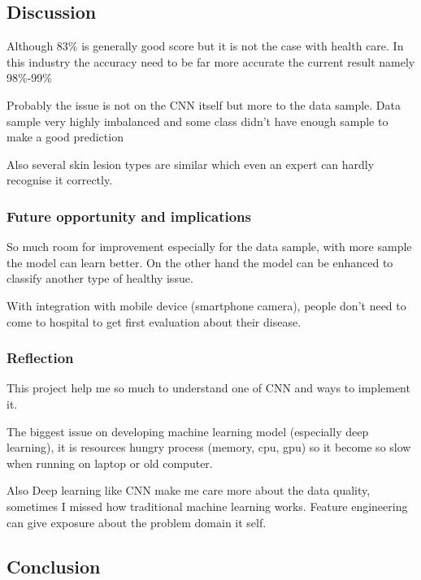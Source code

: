 \documentclass[11pt]{article}
\begin{document}
    \hypertarget{discussion}{%
\subsection{Discussion}\label{discussion}}

Although 83\% is generally good score but it is not the case with health
care. In this industry the accuracy need to be far more accurate the
current result namely 98\%-99\%

Probably the issue is not on the CNN itself but more to the data sample.
Data sample very highly imbalanced and some class didn't have enough
sample to make a good prediction

Also several skin lesion types are similar which even an expert can
hardly recognise it correctly.

\hypertarget{future-opportunity-and-implications}{%
\subsubsection{Future opportunity and
implications}\label{future-opportunity-and-implications}}

So much room for improvement especially for the data sample, with more
sample the model can learn better. On the other hand the model can be
enhanced to classify another type of healthy issue.

With integration with mobile device (smartphone camera), people don't
need to come to hospital to get first evaluation about their disease.

\hypertarget{reflection}{%
\subsubsection{Reflection}\label{reflection}}

This project help me so much to understand one of CNN and ways to
implement it.

The biggest issue on developing machine learning model (especially deep
learning), it is resources hungry process (memory, cpu, gpu) so it
become so slow when running on laptop or old computer.

Also Deep learning like CNN make me care more about the data quality,
sometimes I missed how traditional machine learning works. Feature
engineering can give exposure about the problem domain it self.

    \hypertarget{conclusion}{%
\subsection{Conclusion}\label{conclusion}}
\end{document}
